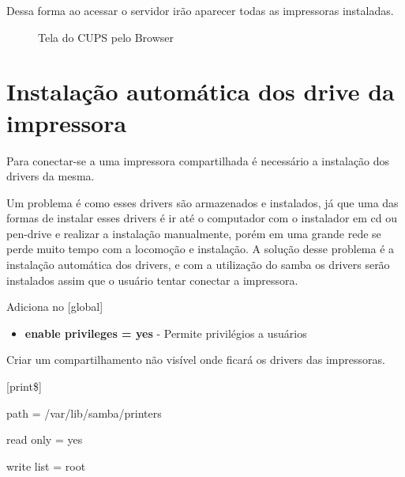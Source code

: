 Dessa forma ao acessar o servidor irão aparecer todas as impressoras instaladas.

\begin{figure}[ht]
   	\centering
   	\caption{Tela do CUPS pelo Browser}
    \label{cups}
\end{figure}

\section{Instalação automática dos drive da impressora}

Para conectar-se a uma impressora compartilhada é necessário a instalação dos drivers da mesma. 

Um problema é como esses drivers são armazenados e instalados, já que uma das formas de instalar esses drivers é ir até o computador com o instalador em cd ou pen-drive e realizar a instalação manualmente, porém em uma grande rede se perde muito tempo com a locomoção e instalação. A solução desse problema é a instalação automática dos drivers, e com a utilização do samba os drivers serão instalados assim que o usuário tentar conectar a impressora.

Adiciona no [global]

\begin{itemize}
	\item \textbf{enable privileges = yes} - Permite privilégios a usuários
\end{itemize}

Criar um compartilhamento não visível onde ficará os drivers das impressoras.

[print\$]

path = /var/lib/samba/printers

read only = yes

write list = root

